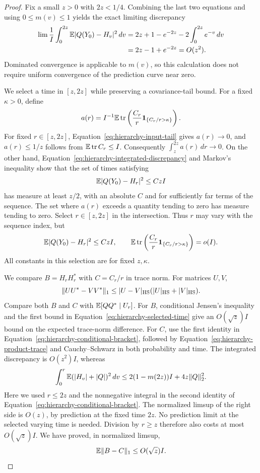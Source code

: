 \begin{proof}
Fix a small $z>0$ with $2z<1/4$.  Combining the last two equations and
using $0\le m(v)\le1$ yields the exact limiting discrepancy
\begin{align}
 \lim\frac1I\int_0^{2z}\mathbb E|Q(Y_0)-H_v|^2\,dv
 &=2z+1-e^{-2z}-2\int_0^{2z}e^{-v}\,dv\\
 &=2z-1+e^{-2z}=O(z^2).
 \label{eq:hierarchy-integrated-discrepancy}
\end{align}
Dominated convergence is applicable to $m(v)$, so this calculation does
not require uniform convergence of the prediction curve near zero.

We select a time in $[z,2z]$ while preserving a covariance-tail bound.
For a fixed $\kappa>0$, define
\[
 a(r)=I^{-1}\mathbb E\operatorname{tr}\left(\frac{C_r}{r}
                   \mathbf 1_{\{C_r/r>\kappa\}}\right).
\]
For fixed $r\in[z,2z]$, Equation~\eqref{eq:hierarchy-input-tail} gives
$a(r)\to0$, and $a(r)\le1/z$ follows from $\mathbb E\operatorname{tr} C_r\le I$.
Consequently $\int_z^{2z}a(r)\,dr\to0$.  On the other hand,
Equation~\eqref{eq:hierarchy-integrated-discrepancy} and Markov's
inequality show that the set of times satisfying
\[
 \mathbb E|Q(Y_0)-H_r|^2\le C zI
\]
has measure at least $z/2$, with an absolute $C$ and for sufficiently
far terms of the sequence.  The set where $a(r)$ exceeds a quantity
tending to zero has measure tending to zero.  Select $r\in[z,2z]$
in the intersection.  Thus $r$ may vary with the sequence index, but
\begin{equation}\label{eq:hierarchy-selected-time}
 \mathbb E|Q(Y_0)-H_r|^2\le CzI,\qquad
 \mathbb E\operatorname{tr}\left(\frac{C_r}{r}\mathbf 1_{\{C_r/r>\kappa\}}\right)=o(I).
\end{equation}
All constants in this selection are for fixed $z,\kappa$.

We compare $B=H_rH_r^*$ with $C=C_r/r$ in trace norm.  For matrices
$U,V$,
\begin{equation}\label{eq:hierarchy-product-trace}
 \|UU^*-VV^*\|_1
 \le |U-V|_{\mathrm{HS}}(|U|_{\mathrm{HS}}+|V|_{\mathrm{HS}}).
\end{equation}
Compare both $B$ and $C$ with $\mathbb E[QQ^*\mid U_r]$.  For $B$, conditional
Jensen's inequality and the first bound in
Equation~\eqref{eq:hierarchy-selected-time} give an $O(\sqrt z)I$
bound on the expected trace-norm difference.  For $C$, use the first
identity in Equation~\eqref{eq:hierarchy-conditional-bracket}, followed
by Equation~\eqref{eq:hierarchy-product-trace} and Cauchy--Schwarz in
both probability and time.  The integrated discrepancy is $O(z^2)I$,
whereas
\[
 \int_0^r\mathbb E(|H_v|+|Q|)^2\,dv
 \le 2(1-m(2z))I+4z\|Q\|_2^2.
\]
Here we used $r\le2z$ and the nonnegative integral in the second
identity of Equation~\eqref{eq:hierarchy-conditional-bracket}.
The normalized limsup of the right side is $O(z)$, by prediction at
the fixed time $2z$. No prediction limit at the selected varying time
is needed.
Division by $r\ge z$ therefore also costs at most $O(\sqrt z)I$.
We have proved, in normalized limsup,
\begin{equation}\label{eq:hierarchy-bracket-comparison}
 \mathbb E\|B-C\|_1\le O(\sqrt z)I.
\end{equation}


\end{proof}
